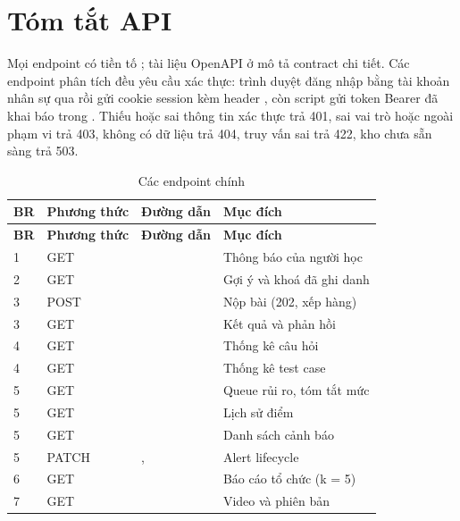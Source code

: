 \chapter{Tóm tắt API}
\label{app:api}

Mọi endpoint có tiền tố ; tài liệu OpenAPI ở  mô tả contract chi tiết. Các endpoint phân tích đều yêu cầu xác thực: trình duyệt đăng nhập bằng tài khoản nhân sự qua  rồi gửi cookie session kèm header , còn script gửi token Bearer đã khai báo trong . Thiếu hoặc sai thông tin xác thực trả 401, sai vai trò hoặc ngoài phạm vi trả 403, không có dữ liệu trả 404, truy vấn sai trả 422, kho chưa sẵn sàng trả 503.

{\small
\begin{longtable}{@{}L{1.0cm}L{1.6cm}L{7.6cm}L{4.4cm}@{}}
\caption{Các endpoint chính}\label{tab:api}\\
\toprule
\textbf{BR} & \textbf{Phương thức} & \textbf{Đường dẫn} & \textbf{Mục đích} \\
\midrule
\endfirsthead
\toprule
\textbf{BR} & \textbf{Phương thức} & \textbf{Đường dẫn} & \textbf{Mục đích} \\
\midrule
{} & GET &  & Thông báo của người học \\
2 & GET &  & Gợi ý và khoá đã ghi danh \\
3 & POST &  & Nộp bài (202, xếp hàng) \\
3 & GET &  & Kết quả và phản hồi \\
4 & GET &  & Thống kê câu hỏi \\
4 & GET &  & Thống kê test case \\
5 & GET &  & Queue rủi ro, tóm tắt mức \\
5 & GET &  & Lịch sử điểm \\
5 & GET &  & Danh sách cảnh báo \\
5 & PATCH & ,  & Alert lifecycle \\
6 & GET &  & Báo cáo tổ chức (k = 5) \\
7 & GET &  & Video và phiên bản \\

\end{longtable}}

